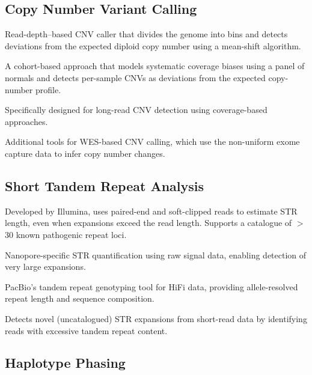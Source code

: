 \subsection{Copy Number Variant Calling}

\begin{description}[style=nextline]
  \item[CNVnator] Read-depth--based CNV caller that divides the genome into bins and detects deviations from the expected diploid copy number using a mean-shift algorithm.
  \item[GATK gCNV (GermlineCNVCaller)] A cohort-based approach that models systematic coverage biases using a panel of normals and detects per-sample CNVs as deviations from the expected copy-number profile.
  \item[Spectre] Specifically designed for long-read CNV detection using coverage-based approaches.
  \item[ERDS, XHMM, CODEX2] Additional tools for WES-based CNV calling, which use the non-uniform exome capture data to infer copy number changes.
\end{description}

\subsection{Short Tandem Repeat Analysis}

\begin{description}[style=nextline]
  \item[ExpansionHunter] Developed by Illumina, uses paired-end and soft-clipped reads to estimate STR length, even when expansions exceed the read length. Supports a catalogue of $>$30 known pathogenic repeat loci.
  \item[STRique] Nanopore-specific STR quantification using raw signal data, enabling detection of very large expansions.
  \item[TRGT] PacBio's tandem repeat genotyping tool for HiFi data, providing allele-resolved repeat length and sequence composition.
  \item[STRling] Detects novel (uncatalogued) STR expansions from short-read data by identifying reads with excessive tandem repeat content.
\end{description}

\subsection{Haplotype Phasing}


